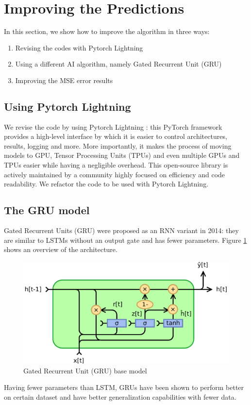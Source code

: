 \documentclass[12pt]{article}
\begin{document}
\section{Improving the Predictions}
In this section, we show how to improve the algorithm in three ways:
\begin{enumerate}
    \item Revising the codes with Pytorch Lightning
    \item Using a different AI algorithm, namely Gated Recurrent Unit (GRU)
    \item Improving the MSE error results
\end{enumerate}

\subsection{Using Pytorch Lightning}
We revise the code by using Pytorch Lightning \cite{falcon2019pytorch}: this PyTorch framework provides a high-level interface by which it is easier to control architectures, results, logging and more. 
More importantly, it makes the process of moving models to GPU, Tensor Processing Units (TPUs) and even multiple GPUs and TPUs easier while having a negligible overhead. This open-source library is actively maintained by a community highly focused on efficiency and code readability. We refactor the code to be used with Pytorch Lightning.

\subsection{The GRU model}
Gated Recurrent Units (GRU) \cite{cho2014learning} were proposed as an RNN variant in 2014: they are similar to LSTMs without an output gate and has fewer parameters. Figure \ref{fig:gru} shows an overview of the architecture.
\begin{figure}[h!]
    \centering
    \includegraphics[width=0.7\linewidth]{images/Gated_Recurrent_Unit,_base_type.pdf}
    \caption{Gated Recurrent Unit (GRU) base model}
    \label{fig:gru}
\end{figure}
Having fewer parameters than LSTM, GRUs have been shown to perform better on certain dataset and have better generalization capabilities with fewer data.
\end{document}
